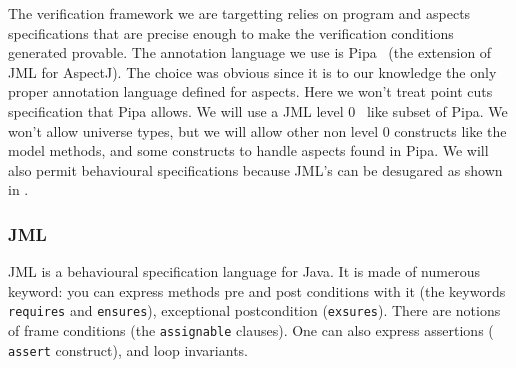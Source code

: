 The verification framework we are targetting relies on program and
aspects specifications that are precise enough to make the
verification conditions generated provable.  The annotation language
we use is Pipa~\cite{ZhaoR03} (the extension of JML for AspectJ).  The
choice was obvious since it is to our knowledge the only proper
annotation language defined for aspects. Here we won't treat point
cuts specification that Pipa allows.  We will use a JML level
0~\cite{Leavens-etal07} like subset of Pipa.  We won't allow universe
types, but we will allow other non level 0 constructs like the model
methods, and some constructs to handle aspects found in Pipa.
We will also permit behavioural specifications because JML's can
be desugared as shown in \cite{RaghavanL00}.

\subsubsection{JML} 
JML is a behavioural specification language for Java. It is made of
numerous keyword: you can express methods pre and post conditions with
it (the keywords {\tt requires} and {\tt ensures}), exceptional
postcondition ({\tt exsures}). There are notions of frame conditions
(the {\tt assignable} clauses). One can also express assertions ({\tt
assert} construct), and loop invariants.

